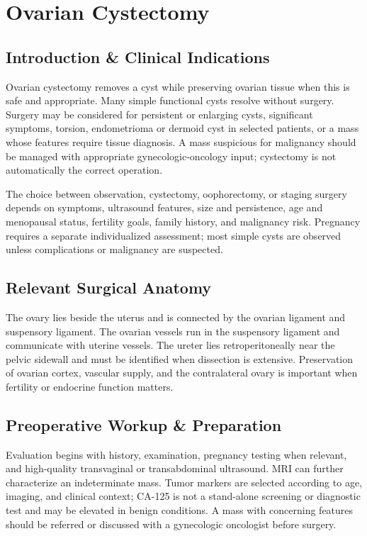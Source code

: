 \chapter{Ovarian Cystectomy}

\section*{Introduction \& Clinical Indications}
Ovarian cystectomy removes a cyst while preserving ovarian tissue when this is safe and appropriate. Many simple functional cysts resolve without surgery. Surgery may be considered for persistent or enlarging cysts, significant symptoms, torsion, endometrioma or dermoid cyst in selected patients, or a mass whose features require tissue diagnosis. A mass suspicious for malignancy should be managed with appropriate gynecologic-oncology input; cystectomy is not automatically the correct operation.

The choice between observation, cystectomy, oophorectomy, or staging surgery depends on symptoms, ultrasound features, size and persistence, age and menopausal status, fertility goals, family history, and malignancy risk. Pregnancy requires a separate individualized assessment; most simple cysts are observed unless complications or malignancy are suspected.

\section*{Relevant Surgical Anatomy}
The ovary lies beside the uterus and is connected by the ovarian ligament and suspensory ligament. The ovarian vessels run in the suspensory ligament and communicate with uterine vessels. The ureter lies retroperitoneally near the pelvic sidewall and must be identified when dissection is extensive. Preservation of ovarian cortex, vascular supply, and the contralateral ovary is important when fertility or endocrine function matters.

\section*{Preoperative Workup \& Preparation}
Evaluation begins with history, examination, pregnancy testing when relevant, and high-quality transvaginal or transabdominal ultrasound. MRI can further characterize an indeterminate mass. Tumor markers are selected according to age, imaging, and clinical context; CA-125 is not a stand-alone screening or diagnostic test and may be elevated in benign conditions. A mass with concerning features should be referred or discussed with a gynecologic oncologist before surgery.


